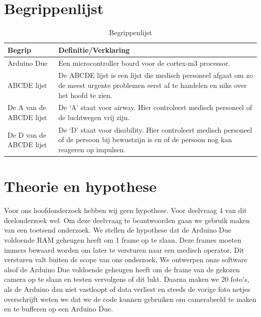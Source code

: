 \documentclass{article}
\begin{document}
\begin{table}[H]
	\centering
	\section{Begrippenlijst}
	\begin{tabular}{ |p{2cm}|p{10cm}| } 
			
		\hline 
		\textbf{Begrip} 		& \textbf{Definitie/Verklaring} \\
		\hline
		\hline

		Arduino Due 			& Een microcontroller board voor de cortex-m3 processor. \\ 
		
		\hline

		ABCDE lijst 			& De ABCDE lijst is een lijst die medisch personeel afgaat om zo de meest urgente problemen eerst af te handelen en niks over het hoofd te zien. \\
		
		\hline
		
		De A van de ABCDE lijst & De ‘A’ staat voor airway. Hier controleert medisch personeel of de luchtwegen vrij zijn. \\
		
		\hline
		
		De D van de ABCDE lijst & De ‘D’ staat voor disability. Hier controleert medisch personeel of de persoon bij bewustzijn is en of de persoon nog kan reageren op impulsen. \\
		
		\hline
	 
		\end{tabular}
		\caption{Begrippenlijst}
		\label{table:1}
	\end{table}

\section{Theorie en hypothese}
Voor ons hoofdonderzoek hebben wij geen hypothese. Voor deelvraag 4 van dit deelonderzoek wel. Om deze deelvraag te beantwoorden gaan we gebruik maken van een toetsend onderzoek. We stellen de hypothese dat de Arduino Due voldoende RAM geheugen heeft om 1 frame op te slaan. Deze frames moeten immers bewaard worden om later te versturen naar een medisch operator. Dit versturen valt buiten de scope van ons onderzoek.
We ontwerpen onze software alsof de Arduino Due voldoende geheugen heeft om de frame van de gekozen camera op te slaan en testen vervolgens of dit lukt. Daarna maken we 20 foto’s, als de Arduino dan niet vastloopt of data verliest en steeds de vorige foto netjes overschrijft weten we dat we de code kunnen gebruiken om camerabeeld te maken en te bufferen op een Arduino Due. 
\end{document}
